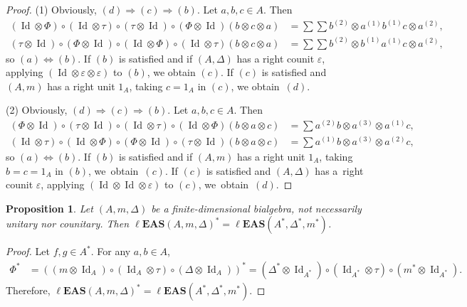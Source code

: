 \documentclass[pdftex]{sigma}
\numberwithin{equation}{section}
\newtheorem{Proposition}[Theorem]{Proposition}
 { \theoremstyle{definition}
\newtheorem{Definition}[Theorem]{Definition}
\newtheorem{Note}[Theorem]{Note}
\newtheorem{Example}[Theorem]{Example}
\newtheorem{Remark}[Theorem]{Remark}
\newtheorem{Notation}[Theorem]{Notation}}
\newcommand{\leas}{\ell\mathbf{EAS}}
\begin{document}
\begin{proof}
(1) Obviously, $(d)\Longrightarrow (c)\Longrightarrow (b)$. Let $a,b,c\in A$. Then
\begin{align*}
(\operatorname{Id} \otimes \Phi)\circ (\operatorname{Id} \otimes \tau)\circ (\tau \otimes \operatorname{Id})\circ (\Phi\otimes \operatorname{Id})(b\otimes c\otimes a)&=\sum \sum b^{(2)}\otimes a^{(1)}b^{(1)}c\otimes a^{(2)},\\
(\tau \otimes \operatorname{Id})\circ (\Phi\otimes \operatorname{Id})\circ (\operatorname{Id} \otimes \Phi)\circ (\operatorname{Id} \otimes \tau)(b\otimes c\otimes a)&=\sum \sum b^{(2)}\otimes b^{(1)}a^{(1)}c\otimes a^{(2)},
\end{align*}
so $(a)\Longleftrightarrow (b)$. If $(b)$ is satisfied and if $(A,\Delta)$ has a right counit $\varepsilon$, applying $(\operatorname{Id} \otimes \varepsilon \otimes \varepsilon)$ to $(b)$, we obtain $(c)$.
If $(c)$ is satisfied and $(A,m)$ has a right unit $1_A$, taking $c=1_A$ in $(c)$, we obtain~$(d)$.

(2) Obviously, $(d)\Longrightarrow (c)\Longrightarrow (b)$. Let $a,b,c\in A$. Then
\begin{align*}
(\Phi\otimes \operatorname{Id})\circ (\tau \otimes \operatorname{Id})\circ (\operatorname{Id} \otimes \tau)\circ (\operatorname{Id} \otimes \Phi)(b\otimes a\otimes c)&=\sum a^{(2)}b\otimes a^{(3)}\otimes a^{(1)}c,\\
(\operatorname{Id} \otimes \tau)\circ (\operatorname{Id} \otimes \Phi)\circ (\Phi\otimes \operatorname{Id})\circ (\tau \otimes \operatorname{Id})(b\otimes a\otimes c)&=\sum a^{(1)}b\otimes a^{(3)}\otimes a^{(2)}c,
\end{align*}
so $(a)\Longleftrightarrow (b)$. If $(b)$ is satisfied and if $(A,m)$ has a right unit $1_A$, taking $b=c=1_A$ in $(b)$, we~obtain~$(c)$. If $(c)$ is satisfied
and $(A,\Delta)$ has a~right counit $\varepsilon$, applying $(\operatorname{Id} \otimes \operatorname{Id} \otimes \varepsilon)$ to $(c)$, we~obtain~$(d)$. \end{proof}

\begin{Proposition}
Let $(A,m,\Delta)$ be a finite-dimensional bialgebra, not necessarily unitary nor counitary. Then $\leas(A,m,\Delta)^*=\leas(A^*,\Delta^*,m^*)$.
\end{Proposition}

\begin{proof}
Let $f,g\in A^*$. For any $a,b\in A$,
\begin{align*}
\Phi^*&=((m\otimes \operatorname{Id}_A)\circ (\operatorname{Id}_A\otimes \tau)\circ (\Delta\otimes \operatorname{Id}_A) )^*=(\Delta^*\otimes \operatorname{Id}_{A^*})\circ (\operatorname{Id}_{A^*}\otimes \tau)\circ (m^*\otimes \operatorname{Id}_{A^*}).
\end{align*}
Therefore, $\leas(A,m,\Delta)^*=\leas(A^*,\Delta^*,m^*)$. \end{proof}
\end{document}
